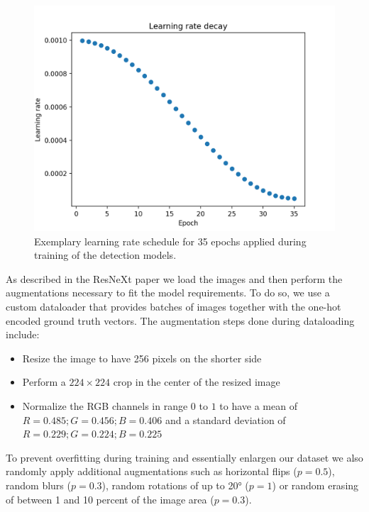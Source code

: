 \begin{figure}[h!]
	\centering
	\includegraphics[width=.6\linewidth]{img/LR.png}
	\caption{Exemplary learning rate schedule for 35 epochs applied during training of the detection models.}
	\label{fig:lr_schedule}
\end{figure}

As described in the ResNeXt paper we load the images and then perform the augmentations necessary to fit the model requirements. To do so, we use a custom dataloader that provides batches of images together with the one-hot encoded ground truth vectors. The augmentation steps done during dataloading include:

\begin{itemize}
	\item Resize the image to have 256 pixels on the shorter side
	\item Perform a $224 \times 224$ crop in the center of the resized image
	\item Normalize the RGB channels in range $0$ to $1$ to have a mean of $R=0.485; G=0.456; B=0.406$ and a standard deviation of $R=0.229; G=0.224; B=0.225$
\end{itemize}

To prevent overfitting during training and essentially enlargen our dataset we also randomly apply additional augmentations such as horizontal flips ($p=0.5$), random blurs ($p=0.3$), random rotations of up to 20° ($p=1$) or random erasing of between 1 and 10 percent of the image area ($p=0.3$).


